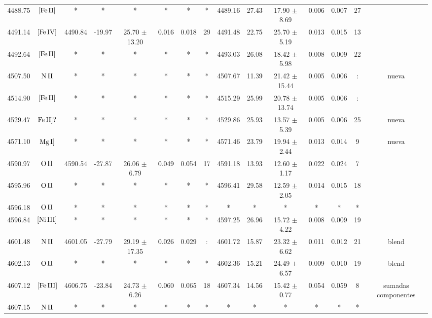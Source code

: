 \documentclass{article}
\begin{document}
\begin{table*}
\begin{adjustbox}{width=\textwidth}
\begin{tabular}{ccccccccccccccc}
4488.75 & $\mbox{[Fe}\thinspace \mbox{II]}$ & * & * & * & * & * & * & 4489.16 & 27.43 & 17.90 $\pm$ 8.69 & 0.006 & 0.007 & 27 &  \\
4491.14 & $\mbox{[Fe}\thinspace \mbox{IV]}$ & 4490.84 & -19.97 & 25.70 $\pm$ 13.20 & 0.016 & 0.018 & 29 & 4491.48 & 22.75 & 25.70 $\pm$ 5.19 & 0.013 & 0.015 & 13 &  \\
4492.64 & $\mbox{[Fe}\thinspace \mbox{II]}$ & * & * & * & * & * & * & 4493.03 & 26.08 & 18.42 $\pm$ 5.98 & 0.008 & 0.009 & 22 &  \\
4507.50 & $\mbox{N}\thinspace \mbox{II}$ & * & * & * & * & * & * & 4507.67 & 11.39 & 21.42 $\pm$ 15.44 & 0.005 & 0.006 & : &  nueva \\
4514.90 & $\mbox{[Fe}\thinspace \mbox{II]}$ & * & * & * & * & * & * & 4515.29 & 25.99 & 20.78 $\pm$ 13.74 & 0.005 & 0.006 & : &  \\
4529.47 & $\mbox{Fe}\thinspace \mbox{II]?}$ & * & * & * & * & * & * & 4529.86 & 25.93 & 13.57 $\pm$ 5.39 & 0.005 & 0.006 & 25 &  nueva \\
4571.10 & $\mbox{Mg}\thinspace \mbox{I]}$ & * & * & * & * & * & * & 4571.46 & 23.79 & 19.94 $\pm$ 2.44 & 0.013 & 0.014 & 9 &  nueva \\
4590.97 & $\mbox{O}\thinspace \mbox{II}$ & 4590.54 & -27.87 & 26.06 $\pm$ 6.79 & 0.049 & 0.054 & 17 & 4591.18 & 13.93 & 12.60 $\pm$ 1.17 & 0.022 & 0.024 & 7 &  \\
4595.96 & $\mbox{O}\thinspace \mbox{II}$ & * & * & * & * & * & * & 4596.41 & 29.58 & 12.59 $\pm$ 2.05 & 0.014 & 0.015 & 18 &  \\
4596.18 & $\mbox{O}\thinspace \mbox{II}$ & * & * & * & * & * & * & * & * & * & * & * & * &  \\
4596.84 & $\mbox{[Ni}\thinspace \mbox{III]}$ & * & * & * & * & * & * & 4597.25 & 26.96 & 15.72 $\pm$ 4.22 & 0.008 & 0.009 & 19 &  \\
4601.48 & $\mbox{N}\thinspace \mbox{II}$ & 4601.05 & -27.79 & 29.19 $\pm$ 17.35 & 0.026 & 0.029 & : & 4601.72 & 15.87 & 23.32 $\pm$ 6.62 & 0.011 & 0.012 & 21 &  blend \\
4602.13 & $\mbox{O}\thinspace \mbox{II}$ & * & * & * & * & * & * & 4602.36 & 15.21 & 24.49 $\pm$ 6.57 & 0.009 & 0.010 & 19 &  blend \\
4607.12 & $\mbox{[Fe}\thinspace \mbox{III]}$ & 4606.75 & -23.84 & 24.73 $\pm$ 6.26 & 0.060 & 0.065 & 18 & 4607.34 & 14.56 & 15.42 $\pm$ 0.77 & 0.054 & 0.059 & 8 &  sumadas componentes \\
4607.15 & $\mbox{N}\thinspace \mbox{II}$ & * & * & * & * & * & * & * & * & * & * & * & * &  \\

\end{tabular}
\end{adjustbox}
\end{table*}
\end{document}
